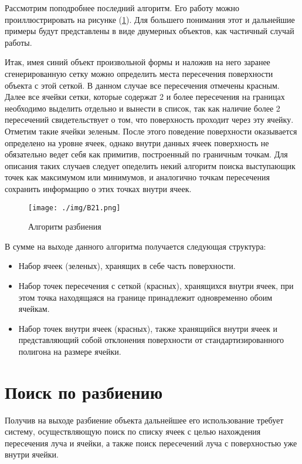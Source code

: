 Рассмотрим поподробнее последний алгоритм. Его работу можно проиллюстрировать на рисунке (\ref{pic:B21}). Для большего понимания этот и дальнейшие примеры будут представлены в виде двумерных объектов, как частичный случай работы.

Итак, имея синий объект произвольной формы и наложив на него заранее сгенерированную сетку можно определить места пересечения поверхности объекта с этой сеткой. В данном случае все пересечения отмечены красным. Далее все ячейки сетки, которые содержат 2 и более пересечения на границах необходимо выделить отдельно и вынести в список, так как наличие более 2 пересечений свидетельствует о том, что поверхность проходит через эту ячейку. Отметим такие ячейки зеленым. После этого поведение поверхности оказывается определено на уровне ячеек, однако внутри данных ячеек поверхность не обязательно ведет себя как примитив, построенный по граничным точкам. Для описания таких случаев следует опеделить некий алгоритм поиска выступающик точек как максимумом или минимумов, и аналогично точкам пересечения сохранить информацию о этих точках внутри ячеек.

\begin{figure} 
\begin{center}
\texttt{[image: ./img/B21.png]}
\end{center}
\caption{Алгоритм разбиения}
\label{pic:B21}
\end{figure}

В сумме на выходе данного алгоритма получается следующая структура: 

\begin{itemize}
	\item Набор ячеек (зеленых), хранящих в себе часть поверхности.
	\item Набор точек пересечения с сеткой (красных), хранящихся внутри ячеек, при этом точка находящаяся на границе принадлежит одновременно обоим ячейкам.
	\item Набор точек внутри ячеек (красных), также хранящийся внутри ячеек и  представляющий собой отклонения поверхности от стандартизированного полигона на размере ячейки.
\end{itemize} 

\section{Поиск по разбиению}

Получив на выходе разбиение объекта дальнейшее его использование требует систему, осуществляющую поиск по списку ячеек с целью нахождения пересечения луча и ячейки, а также поиск пересечений луча с поверхностью уже внутри ячейки. 

